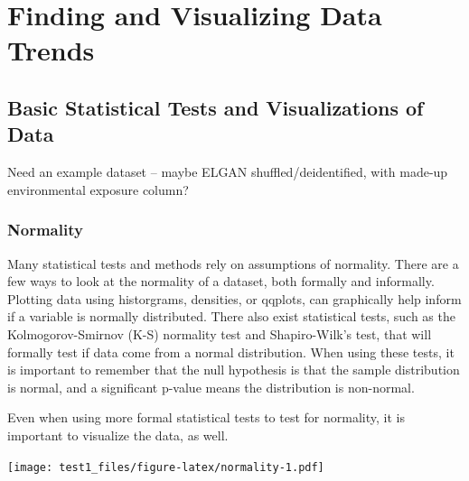 \documentclass[
]{book}
\newenvironment{Shaded}{\begin{snugshade}}{\end{snugshade}}
\newcommand{\CommentTok}[1]{\textcolor[rgb]{0.56,0.35,0.01}{\textit{#1}}}
\newcommand{\DataTypeTok}[1]{\textcolor[rgb]{0.13,0.29,0.53}{#1}}
\newcommand{\DecValTok}[1]{\textcolor[rgb]{0.00,0.00,0.81}{#1}}
\newcommand{\KeywordTok}[1]{\textcolor[rgb]{0.13,0.29,0.53}{\textbf{#1}}}
\newcommand{\NormalTok}[1]{#1}
\newcommand{\OperatorTok}[1]{\textcolor[rgb]{0.81,0.36,0.00}{\textbf{#1}}}
\begin{document}
\hypertarget{finding-and-visualizing-data-trends}{%
\chapter{Finding and Visualizing Data Trends}\label{finding-and-visualizing-data-trends}}

\hypertarget{basic-statistical-tests-and-visualizations-of-data}{%
\section{Basic Statistical Tests and Visualizations of Data}\label{basic-statistical-tests-and-visualizations-of-data}}

Need an example dataset -- maybe ELGAN shuffled/deidentified, with made-up environmental exposure column?

\hypertarget{normality}{%
\subsection{Normality}\label{normality}}

Many statistical tests and methods rely on assumptions of normality. There are a few ways to look at the normality of a dataset, both formally and informally. Plotting data using historgrams, densities, or qqplots, can graphically help inform if a variable is normally distributed. There also exist statistical tests, such as the Kolmogorov-Smirnov (K-S) normality test and Shapiro-Wilk's test, that will formally test if data come from a normal distribution. When using these tests, it is important to remember that the null hypothesis is that the sample distribution is normal, and a significant p-value means the distribution is non-normal.

Even when using more formal statistical tests to test for normality, it is important to visualize the data, as well.

\begin{Shaded}
\end{Shaded}

\texttt{[image: test1\_files/figure-latex/normality-1.pdf]}

\begin{Shaded}
\end{Shaded}
\end{document}
